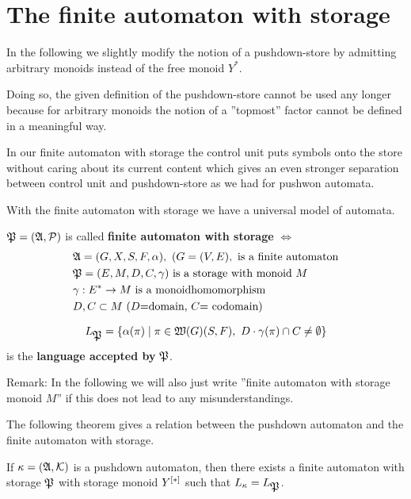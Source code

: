 \section{The finite automaton with storage}

In the following we slightly modify the notion of a pushdown-store by admitting
arbitrary monoids instead of the free monoid $Y^*$.

Doing so, the given definition of the pushdown-store cannot be used any longer
because for arbitrary monoids the notion of a ''topmost'' factor cannot be
defined in a meaningful way.

In our finite automaton with storage the control unit puts symbols onto the
store without caring about its current content which gives an even stronger
separation between control unit and pushdown-store as we had for pushwon
automata.

With the finite automaton with storage we have a universal model of automata.

\begin{definition}
$\mbox{$\mathfrak{P}$} = (\mbox{$\mathfrak{A}$}, \mbox{$\mathcal{P}$})$ is called {\bf finite automaton with storage}
$\iff$
\begin{eqnarray*}
& \mbox{$\mathfrak{A}$}=(G, X, S, F, \alpha),\ (G=(V,E),\text{ is a finite automaton} \\
& \mbox{$\mathfrak{P}$}=(E, M, D, C, \gamma)\text{ is a storage with monoid }M \\
& \gamma: E^* \to M\text{ is a monoidhomomorphism} \\
& D,C \subset M\text{ ($D$=domain, $C$= codomain)}
\end{eqnarray*}
\end{definition}

\[ L_{\mbox{$\mathfrak{P}$}} = \mbox{$\{\alpha(\pi) \mid \pi \in \mbox{$\mathfrak{W}({G})$}(S, F),\ D\cdot
\gamma(\pi) \cap C \neq \emptyset\}$}
\]
is the {\bf language accepted by} $\mbox{$\mathfrak{P}$}$.

Remark: In the following we will also just write ''finite automaton with storage
monoid $M$'' if this does not lead to any misunderstandings.

\bigskip
The following theorem gives a relation between the pushdown automaton and the
finite automaton with storage.

\begin{theorem}
If $\kappa = (\mbox{$\mathfrak{A}$}, \mbox{$\mathcal{K}$})$ is a pushdown automaton, then there exists a
finite automaton with storage $\mbox{$\mathfrak{P}$}$ with storage monoid $\mbox{${Y}^{[*]}$}$ such
that $L_{\kappa} = L_{\mbox{$\mathfrak{P}$}}$.
\end{theorem}

